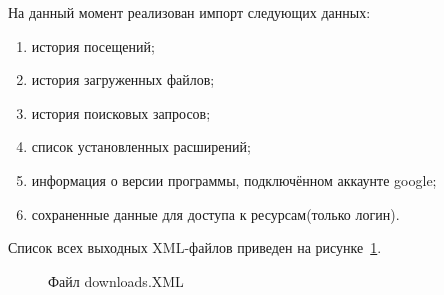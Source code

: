На данный момент реализован импорт следующих данных:

\begin{enumerate}
  \item история посещений;
  \item история загруженных файлов;
  \item история поисковых запросов;
  \item список установленных расширений;
  \item информация о версии программы, подключённом аккаунте google;
  \item сохраненные данные для доступа к ресурсам(только логин).
\end{enumerate}

Список всех выходных XML-файлов приведен на рисунке~\ref{ship_12:ship_12}.

\begin{figure}[h!]
\caption{Файл downloads.XML}
\label{ship_12:ship_12}
\end{figure}







